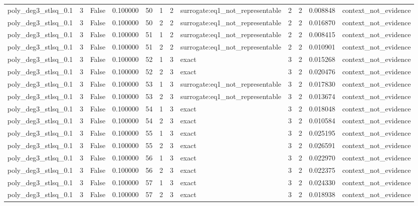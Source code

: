 \begin{tabular}{lrrrrrrlrrrl}
poly\_deg3\_stlsq\_0.1 & 3 & False & 0.100000 & 50 & 1 & 2 & surrogate:eq1\_not\_representable & 2 & 2 & 0.008848 & context\_not\_evidence \\
poly\_deg3\_stlsq\_0.1 & 3 & False & 0.100000 & 50 & 2 & 2 & surrogate:eq1\_not\_representable & 2 & 2 & 0.016870 & context\_not\_evidence \\
poly\_deg3\_stlsq\_0.1 & 3 & False & 0.100000 & 51 & 1 & 2 & surrogate:eq1\_not\_representable & 2 & 2 & 0.008415 & context\_not\_evidence \\
poly\_deg3\_stlsq\_0.1 & 3 & False & 0.100000 & 51 & 2 & 2 & surrogate:eq1\_not\_representable & 2 & 2 & 0.010901 & context\_not\_evidence \\
poly\_deg3\_stlsq\_0.1 & 3 & False & 0.100000 & 52 & 1 & 3 & exact & 3 & 2 & 0.015268 & context\_not\_evidence \\
poly\_deg3\_stlsq\_0.1 & 3 & False & 0.100000 & 52 & 2 & 3 & exact & 3 & 2 & 0.020476 & context\_not\_evidence \\
poly\_deg3\_stlsq\_0.1 & 3 & False & 0.100000 & 53 & 1 & 3 & surrogate:eq1\_not\_representable & 3 & 2 & 0.017830 & context\_not\_evidence \\
poly\_deg3\_stlsq\_0.1 & 3 & False & 0.100000 & 53 & 2 & 3 & surrogate:eq1\_not\_representable & 3 & 2 & 0.013674 & context\_not\_evidence \\
poly\_deg3\_stlsq\_0.1 & 3 & False & 0.100000 & 54 & 1 & 3 & exact & 3 & 2 & 0.018048 & context\_not\_evidence \\
poly\_deg3\_stlsq\_0.1 & 3 & False & 0.100000 & 54 & 2 & 3 & exact & 3 & 2 & 0.010584 & context\_not\_evidence \\
poly\_deg3\_stlsq\_0.1 & 3 & False & 0.100000 & 55 & 1 & 3 & exact & 3 & 2 & 0.025195 & context\_not\_evidence \\
poly\_deg3\_stlsq\_0.1 & 3 & False & 0.100000 & 55 & 2 & 3 & exact & 3 & 2 & 0.026591 & context\_not\_evidence \\
poly\_deg3\_stlsq\_0.1 & 3 & False & 0.100000 & 56 & 1 & 3 & exact & 3 & 2 & 0.022970 & context\_not\_evidence \\
poly\_deg3\_stlsq\_0.1 & 3 & False & 0.100000 & 56 & 2 & 3 & exact & 3 & 2 & 0.022375 & context\_not\_evidence \\
poly\_deg3\_stlsq\_0.1 & 3 & False & 0.100000 & 57 & 1 & 3 & exact & 3 & 2 & 0.024330 & context\_not\_evidence \\
poly\_deg3\_stlsq\_0.1 & 3 & False & 0.100000 & 57 & 2 & 3 & exact & 3 & 2 & 0.018938 & context\_not\_evidence \\

\end{tabular}
